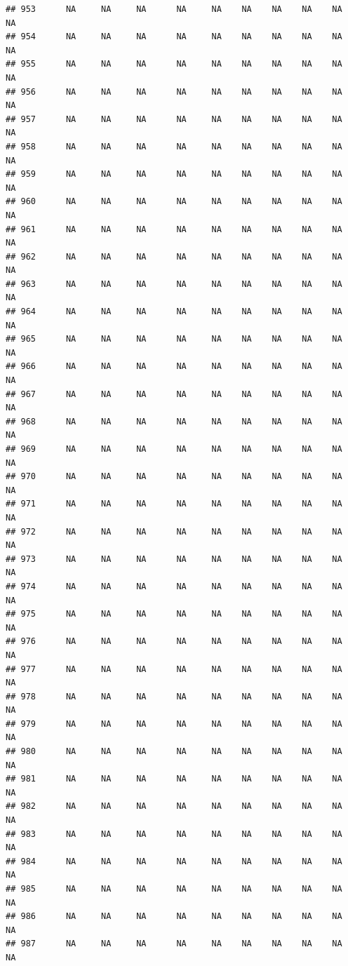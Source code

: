 \documentclass{article}\usepackage{graphicx, color}
\makeatletter
\newenvironment{kframe}{%
 \def\at@end@of@kframe{}%
 \ifinner\ifhmode%
  \def\at@end@of@kframe{\end{minipage}}%
  \begin{minipage}{\columnwidth}%
 \fi\fi%
 \def\FrameCommand##1{\hskip\@totalleftmargin \hskip-\fboxsep
 \colorbox{shadecolor}{##1}\hskip-\fboxsep
     \hskip-\linewidth \hskip-\@totalleftmargin \hskip\columnwidth}%
 \MakeFramed {\advance\hsize-\width
   \@totalleftmargin\z@ \linewidth\hsize
   \@setminipage}}%
 {\par\unskip\endMakeFramed%
 \at@end@of@kframe}
\newenvironment{knitrout}{}{} %
\makeatother
\begin{document}
\begin{knitrout}
\begin{kframe}
\begin{verbatim}
## 953      NA     NA     NA      NA     NA    NA    NA    NA    NA     NA
## 954      NA     NA     NA      NA     NA    NA    NA    NA    NA     NA
## 955      NA     NA     NA      NA     NA    NA    NA    NA    NA     NA
## 956      NA     NA     NA      NA     NA    NA    NA    NA    NA     NA
## 957      NA     NA     NA      NA     NA    NA    NA    NA    NA     NA
## 958      NA     NA     NA      NA     NA    NA    NA    NA    NA     NA
## 959      NA     NA     NA      NA     NA    NA    NA    NA    NA     NA
## 960      NA     NA     NA      NA     NA    NA    NA    NA    NA     NA
## 961      NA     NA     NA      NA     NA    NA    NA    NA    NA     NA
## 962      NA     NA     NA      NA     NA    NA    NA    NA    NA     NA
## 963      NA     NA     NA      NA     NA    NA    NA    NA    NA     NA
## 964      NA     NA     NA      NA     NA    NA    NA    NA    NA     NA
## 965      NA     NA     NA      NA     NA    NA    NA    NA    NA     NA
## 966      NA     NA     NA      NA     NA    NA    NA    NA    NA     NA
## 967      NA     NA     NA      NA     NA    NA    NA    NA    NA     NA
## 968      NA     NA     NA      NA     NA    NA    NA    NA    NA     NA
## 969      NA     NA     NA      NA     NA    NA    NA    NA    NA     NA
## 970      NA     NA     NA      NA     NA    NA    NA    NA    NA     NA
## 971      NA     NA     NA      NA     NA    NA    NA    NA    NA     NA
## 972      NA     NA     NA      NA     NA    NA    NA    NA    NA     NA
## 973      NA     NA     NA      NA     NA    NA    NA    NA    NA     NA
## 974      NA     NA     NA      NA     NA    NA    NA    NA    NA     NA
## 975      NA     NA     NA      NA     NA    NA    NA    NA    NA     NA
## 976      NA     NA     NA      NA     NA    NA    NA    NA    NA     NA
## 977      NA     NA     NA      NA     NA    NA    NA    NA    NA     NA
## 978      NA     NA     NA      NA     NA    NA    NA    NA    NA     NA
## 979      NA     NA     NA      NA     NA    NA    NA    NA    NA     NA
## 980      NA     NA     NA      NA     NA    NA    NA    NA    NA     NA
## 981      NA     NA     NA      NA     NA    NA    NA    NA    NA     NA
## 982      NA     NA     NA      NA     NA    NA    NA    NA    NA     NA
## 983      NA     NA     NA      NA     NA    NA    NA    NA    NA     NA
## 984      NA     NA     NA      NA     NA    NA    NA    NA    NA     NA
## 985      NA     NA     NA      NA     NA    NA    NA    NA    NA     NA
## 986      NA     NA     NA      NA     NA    NA    NA    NA    NA     NA
## 987      NA     NA     NA      NA     NA    NA    NA    NA    NA     NA

\end{verbatim}
\end{kframe}
\end{knitrout}
\end{document}
